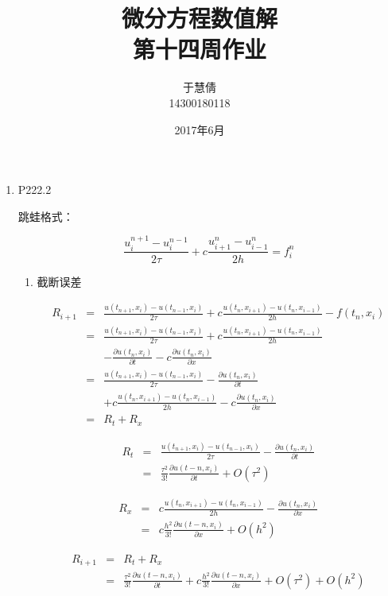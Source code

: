 \documentclass{ctexart}
\title{微分方程数值解 \\ 第十四周作业}
\author{于慧倩 \\ 14300180118}
\date{2017年6月}
\begin{document}
\maketitle

\newpage

\begin{enumerate}

\item P222.2

跳蛙格式：

$$
\frac{u_i^{n+1}-u_i^{n-1}}{2 \tau}+c \frac{u_{i+1}^n-u_{i-1}^n}{2h}=f_i^n
$$

\begin{enumerate}

\item 截断误差

\begin{eqnarray*}
R_{i+1} &=& \frac{u(t_{n+1},x_i)-u(t_{n-1},x_i)}{2 \tau}+c\frac{u(t_n,x_{i+1})-u(t_n,x_{i-1})}{2h}-f(t_n,x_i)\\
&=& \frac{u(t_{n+1},x_i)-u(t_{n-1},x_i)}{2 \tau}+c\frac{u(t_n,x_{i+1})-u(t_n,x_{i-1})}{2h}\\
&&-\frac{\partial u(t_n,x_i)}{\partial t}-c\frac{\partial u(t_n,x_i)}{\partial x}\\
&=& \frac{u(t_{n+1},x_i)-u(t_{n-1},x_i)}{2 \tau}-\frac{\partial u(t_n,x_i)}{\partial t}\\
&&+c\frac{u(t_n,x_{i+1})-u(t_n,x_{i-1})}{2h}-c\frac{\partial u(t_n,x_i)}{\partial x}\\
&=& R_t+R_x
\end{eqnarray*}

\begin{eqnarray*}
R_t&=& \frac{u(t_{n+1},x_i)-u(t_{n-1},x_i)}{2 \tau}-\frac{\partial u(t_n,x_i)}{\partial t}\\
&=& \frac{\tau^2}{3!} \frac{\partial u(t-n,x_i)}{\partial t} +O(\tau^2)
\end{eqnarray*}

\begin{eqnarray*}
R_x&=& c \frac{u(t_n,x_{i+1})-u(t_n,x_{i-1})}{2 h}-\frac{\partial u(t_n,x_i)}{\partial x}\\
&=& c\frac{h^2}{3!} \frac{\partial u(t-n,x_i)}{\partial x} +O(h^2)
\end{eqnarray*}

\begin{eqnarray*}
R_{i+1}&=&R_t+R_x\\
&=&\frac{\tau^2}{3!} \frac{\partial u(t-n,x_i)}{\partial t}+ c\frac{h^2}{3!} \frac{\partial u(t-n,x_i)}{\partial x} +O(\tau^2) +O(h^2)
\end{eqnarray*}


\end{enumerate}
\end{enumerate}
\end{document}
